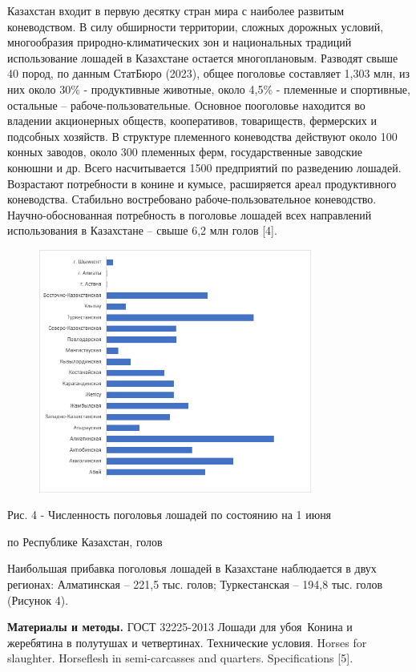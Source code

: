 Казахстан входит в первую десятку стран мира с наиболее развитым
коневодством. В силу обширности территории, сложных дорожных условий,
многообразия природно-климатических зон и национальных традиций
использование лошадей в Казахстане остается многоплановым. Разводят
свыше 40 пород, по данным СтатБюро (2023), общее поголовье составляет
1,303 млн, из них около 30\% - продуктивные животные, около 4,5\% -
племенные и спортивные, остальные -- рабоче-пользовательные. Основное
пооголовье находится во владении акционерных обществ, кооперативов,
товариществ, фермерских и подсобных хозяйств. В структуре племенного
коневодства действуют около 100 конных заводов, около 300 племенных
ферм, государственные заводские конюшни и др. Всего насчитывается 1500
предприятий по разведению лошадей. Возрастают потребности в конине и
кумысе, расширяется ареал продуктивного коневодства. Стабильно
востребовано рабоче-пользовательное коневодство. Научно-обоснованная
потребность в поголовье лошадей всех направлений использования в
Казахстане -- свыше 6,2 млн голов {[}4{]}.

\begin{figure}[H]
	\centering
	\includegraphics[width=0.8\textwidth]{assets/309}
	\caption*{}
\end{figure}

Рис. 4 - Численность поголовья лошадей по состоянию на 1 июня

по Республике Казахстан, голов

Наибольшая прибавка поголовья лошадей в Казахстане наблюдается в двух
регионах: Алматинская -- 221,5 тыс. голов; Туркестанская -- 194,8 тыс.
голов (Рисунок 4).

{\bfseries Материалы и методы.} ГОСТ 32225-2013 Лошади для убоя~Конина и
жеребятина в полутушах и четвертинах. Технические условия. Horses for
slaughter. Horseflesh in semi-carcasses and quarters. Specifications
{[}5{]}.

